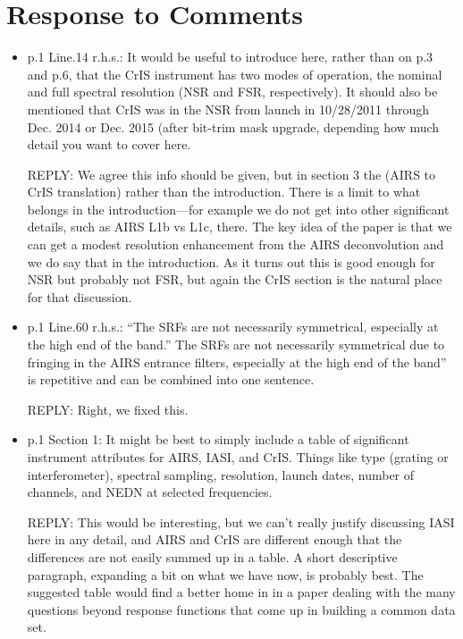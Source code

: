 \documentclass[11pt]{article}
\newcommand {\reply} {\mbox{\small REPLY}}
\begin{document}
\section{Response to Comments}

\begin{itemize}

\item p.1 Line.14 r.h.s.: It would be useful to introduce here,
  rather than on p.3 and p.6, that the CrIS instrument has two modes
  of operation, the nominal and full spectral resolution (NSR and
  FSR, respectively).  It should also be mentioned that CrIS was in
  the NSR from launch in 10/28/2011 through Dec. 2014 or Dec. 2015
  (after bit-trim mask upgrade, depending how much detail you want
  to cover here.

  \reply: We agree this info should be given, but in section 3 the
  (AIRS to CrIS translation) rather than the introduction.  There is
  a limit to what belongs in the introduction---for example we do
  not get into other significant details, such as AIRS L1b vs L1c,
  there.  The key idea of the paper is that we can get a modest
  resolution enhancement from the AIRS deconvolution and we do say
  that in the introduction.  As it turns out this is good enough for
  NSR but probably not FSR, but again the CrIS section is the
  natural place for that discussion.
  

\item p.1 Line.60 r.h.s.: ``The SRFs are not necessarily
  symmetrical, especially at the high end of the band.''  The SRFs
  are not necessarily symmetrical due to fringing in the AIRS
  entrance filters, especially at the high end of the band” is
  repetitive and can be combined into one sentence.

  \reply: Right, we fixed this.

\item p.1 Section 1: It might be best to simply include a table of
  significant instrument attributes for AIRS, IASI, and CrIS. Things
  like type (grating or interferometer), spectral sampling,
  resolution, launch dates, number of channels, and NEDN at selected
  frequencies.

  \reply: This would be interesting, but we can't really justify
  discussing IASI here in any detail, and AIRS and CrIS are
  different enough that the differences are not easily summed up in
  a table.  A short descriptive paragraph, expanding a bit on what
  we have now, is probably best.  The suggested table would find a
  better home in in a paper dealing with the many questions beyond
  response functions that come up in building a common data set.


\end{itemize}
\end{document}
